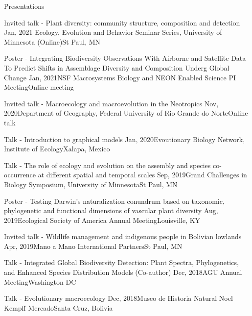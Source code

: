 \documentclass{resume} %
\begin{document}
\begin{rSection}{Presentations}

\begin{sSubsection}{Invited talk - Plant diversity: community structure, composition and detection}{ }{Jan, 2021}{ Ecology, Evolution and Behavior Seminar Series, University of Minnesota (Online)}{St Paul, MN}
\end{sSubsection}

\begin{sSubsection}{Poster - Integrating Biodiversity Observations With Airborne and Satellite Data To Predict Shifts in Assemblage Diversity and Composition Underg Global Change}{ }{Jan, 2021}{NSF Macrosystems Biology and NEON Enabled Science PI Meeting}{Online meeting}
\end{sSubsection}

\begin{sSubsection}{Invited talk - Macroecology and macroevolution in the Neotropics}{ }{Nov, 2020}{Department of Geography, Federal University of Rio Grande do Norte}{Online talk}
\end{sSubsection}

\begin{sSubsection}{Talk - Introduction to graphical models}{ }{Jan, 2020}{Evoutionary Biology Network, Institute of Ecology}{Xalapa, Mexico}
\end{sSubsection}

\begin{sSubsection}{Talk - The role of ecology and evolution on the assembly and species co-occurrence at different spatial and temporal scales}{ }{Sep, 2019}{Grand Challenges in Biology Symposium, University of Minnesota}{St Paul, MN}
\end{sSubsection}

\begin{sSubsection}{Poster - Testing Darwin's naturalization conundrum based on taxonomic, phylogenetic and functional dimensions of vascular plant diversity}{ }{Aug, 2019}{Ecological Society of America Annual Meeting}{Louisville, KY}
\end{sSubsection}

\begin{sSubsection}{Invited talk - Wildlife management and indigenous people in Bolivian lowlands}{ }{Apr, 2019}{Mano a Mano International Partners}{St Paul, MN}
\end{sSubsection}

\begin{sSubsection}{Talk - Integrated Global Biodiversity Detection: Plant Spectra, Phylogenetics, and Enhanced Species Distribution Models}{ (Co-author) }{Dec, 2018}{AGU Annual Meeting}{Washington DC}
\end{sSubsection}

\begin{sSubsection}{Talk - Evolutionary macroecology}{ }{Dec, 2018}{Museo de Historia Natural Noel Kempff Mercado}{Santa Cruz, Bolivia}
\end{sSubsection}


\end{rSection}
\end{document}
